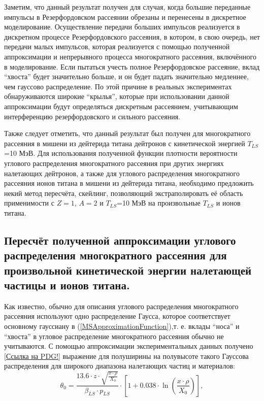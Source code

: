 \documentclass[a4paper,12pt]{article}
\begin{document}
\begin{large}
	Заметим, что данный результат получен для случая, когда большие переданные импульсы в Резерфордовском рассеянии обрезаны и перенесены в дискретное моделирование. Осуществление передачи больших импульсов реализуется в дискретном процессе Резерфордовского рассеяния, в котором, в свою очередь, нет передачи малых импульсов, которая реализуется с помощью полученной аппроксимации и непрерывного процесса многократного рассеяния, включённого в моделирование.
  Если пытаться учесть полное Резерфордовское рассеяние, вклад ``хвоста'' будет значительно больше, и он будет падать значительно медленнее, чем гауссово распределение.
  По этой причине в реальных экспериментах обнаруживаются широкие ``крылья'', которые при использовании данной аппроксимации будут определяться дискретным рассеянием, учитывающим интерференцию резерфордовского и сильного рассеяния.
  
  Также следует отметить, что данный результат был получен для многократного рассеяния в мишени из дейтерида титана дейтронов с кинетической энергией $T_{LS}$=10 МэВ. Для использования полученной функции плотности вероятности углового распределения многократного рассеяния при других энергиях налетающих дейтронов, а также для углового распределения многократного рассеяния ионов титана в мишени из дейтерида титана, необходимо предложить некий метод пересчёта, скейлинг, позволяющий экстраполировать её область применимости с $Z=1$, $A=2$ и $T_{LS}$=10 МэВ на произвольные $T_{LS}$ и ионов титана.
  
\subsection{Пересчёт полученной аппроксимации углового распределения многократного рассеяния для произвольной кинетической энергии налетающей частицы и ионов титана.}
\label{subValMS2}

	Как известно, обычно для описания углового распределения многократного рассеяния используют одно распределение Гаусса, которое соответствует основному гауссиану в  (\ref{MSApproximationFunction}),т. е. вклады ``носа'' и ``хвоста'' в угловое распределение многократного рассеяния обычно не учитываются. С помощью аппроксимации экспериментальных данных получено [\underline{Ссылка на PDG!}] выражение для полуширины на полувысоте такого Гауссова распределения для широкого диапазона налетающих частиц и материалов:
\begin{equation}
  \label{Theta0}
  \theta_0=\frac{13.6 \cdot z \cdot \sqrt{\frac{x\cdot \rho}{X_0}}}{\beta_{LS}\cdot p_{LS}}\cdot\left[ 1+0.038\cdot\ln\left(\frac{x\cdot \rho}{X_0}\right)\right],
\end{equation}	


\end{large}
\end{document}
